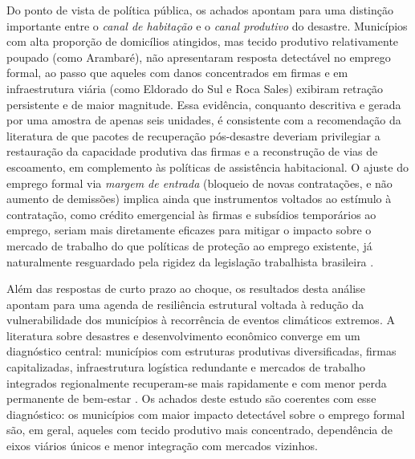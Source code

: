 \documentclass[a4paper,12pt]{article}
\begin{document}
Do ponto de vista de política pública, os achados apontam para uma distinção importante
entre o \emph{canal de habitação} e o \emph{canal produtivo} do desastre. Municípios
com alta proporção de domicílios atingidos, mas tecido produtivo relativamente poupado
(como Arambaré), não apresentaram resposta detectável no emprego formal, ao passo que
aqueles com danos concentrados em firmas e em infraestrutura viária (como Eldorado do Sul
e Roca Sales) exibiram retração persistente e de maior magnitude. Essa evidência,
conquanto descritiva e gerada por uma amostra de apenas seis unidades, é consistente com
a recomendação da literatura de que pacotes de recuperação pós-desastre deveriam
privilegiar a restauração da capacidade produtiva das firmas e a reconstrução de vias de
escoamento, em complemento às políticas de assistência habitacional. O ajuste do
emprego formal via \emph{margem de entrada} (bloqueio de novas contratações, e não
aumento de demissões) implica ainda que instrumentos voltados ao estímulo à contratação,
como crédito emergencial às firmas e subsídios temporários ao emprego, seriam mais
diretamente eficazes para mitigar o impacto sobre o mercado de trabalho do que políticas
de proteção ao emprego existente, já naturalmente resguardado pela rigidez da legislação
trabalhista brasileira \cite{krein2012, teixeira2024}.

Além das respostas de curto prazo ao choque, os resultados desta análise apontam
para uma agenda de resiliência estrutural voltada à redução da vulnerabilidade dos
municípios à recorrência de eventos climáticos extremos. A literatura sobre desastres
e desenvolvimento econômico converge em um diagnóstico central: municípios com
estruturas produtivas diversificadas, firmas capitalizadas, infraestrutura logística
redundante e mercados de trabalho integrados regionalmente recuperam-se mais
rapidamente e com menor perda permanente de bem-estar
\cite{botzen2019, kahn2005death, berlemann2018}. Os achados deste estudo são
coerentes com esse diagnóstico: os municípios com maior impacto detectável sobre o
emprego formal são, em geral, aqueles com tecido produtivo mais concentrado,
dependência de eixos viários únicos e menor integração com mercados vizinhos.
\end{document}
